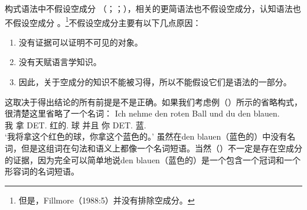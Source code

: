构式语法中不假设空成分\indexcxgc\label{Seite-leere-Elemente-CxG} （\citealp[--50]{MR2001a}；\citealp[]{Goldberg2003b}；\citealp[]{Goldberg2006a}），相关的更简语法\citep{CJ2005a}也不假设空成分，认知语法也不假设空成分 。\footnote{
  但是，Fillmore（1988:5）并没有排除空成分。
}不假设空成分主要有以下几点原因：
\begin{enumerate}
\item 没有证据可以证明不可见的对象。
\item 没有天赋语言学知识。
\item 因此，关于空成分的知识不能被习得，所以不能假设它们是语法的一部分。
\end{enumerate}
这取决于得出结论的所有前提是不是正确。如果我们考虑例（）所示的省略构式，很清楚这里省略了一个名词：
\ea
\gll Ich nehme den roten Ball und du den blauen.\\
	 我 拿 DET.\acc{} 红的.\acc{} 球 并且 你 DET.\acc{} 蓝.\acc{}\\
\glt `我将拿这个红色的球，你拿这个蓝色的。'
\z
虽然在den blauen（蓝色的）中没有名词，但是这组词在句法和语义上都像一个名词短语。当然（）不一定是存在空成分的证据，因为完全可以简单地说den blauen（蓝色的）是一个包含一个冠词和一个形容词的名词短语\citep{Wunderlich87d}。

